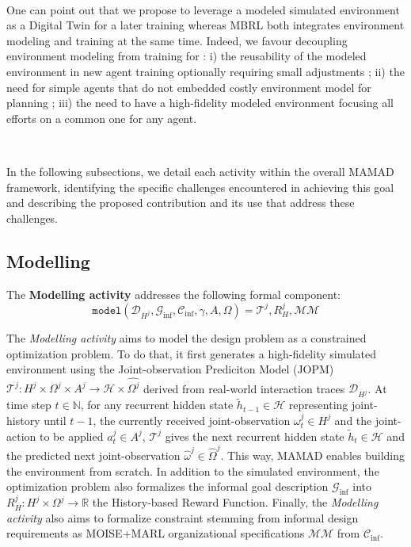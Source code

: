 \documentclass[pdflatex,sn-mathphys-num]{sn-jnl}%
\theoremstyle{thmstyleone}%
\theoremstyle{thmstyletwo}%
\theoremstyle{thmstylethree}%
\begin{document}
\

\noindent One can point out that we propose to leverage a modeled simulated environment as a Digital Twin for a later training whereas MBRL both integrates environment modeling and training at the same time. Indeed, we favour decoupling environment modeling from training for : i) the reusability of the modeled environment in new agent training optionally requiring small adjustments ; \quad ii) the need for simple agents that do not embedded costly environment model for planning ; \quad iii) the need to have a high-fidelity modeled environment focusing all efforts on a common one for any agent.

\

\noindent In the following subsections, we detail each activity within the overall MAMAD framework, identifying the specific challenges encountered in achieving this goal and describing the proposed contribution and its use that address these challenges.

\subsection{Modelling}\label{sec:modelling}

The \textbf{Modelling activity} addresses the following formal component:
\begin{displaymath}
    \texttt{model}(\mathcal{D}_{H^j}, \mathcal{G}_{\text{inf}}, \mathcal{C}_{\text{inf}}, \gamma, A, \Omega) = \mathcal{T}^j, R^j_H, \mathcal{MM}
\end{displaymath}

\noindent The \textit{Modelling activity} aims to model the design problem as a constrained optimization problem. To do that, it first generates a high-fidelity simulated environment using the Joint-observation Prediciton Model (JOPM) $\mathcal{T}^j: H^j \times \Omega^j \times A^j \rightarrow \mathcal{H} \times \hat{\Omega^j}$ derived from real-world interaction traces $\mathcal{D}_{H^j}$. At time step $t \in \mathbb{N}$, for any recurrent hidden state $\tilde{h}_{t-1} \in \mathcal{H}$ representing joint-history until $t-1$, the currently received joint-observation $\omega_t^j \in H^j$ and the joint-action to be applied $a_t^j \in A^j$, $\mathcal{T}^j$ gives the next recurrent hidden state $\tilde{h}_t \in \mathcal{H}$ and the predicted next joint-observation $\hat{\omega}^j \in \hat{\Omega}^j$. This way, MAMAD enables building the environment from scratch. In addition to the simulated environment, the optimization problem also formalizes the informal goal description $\mathcal{G}_{\text{inf}}$ into $R^j_H: H^j \times \Omega^j \rightarrow \mathbb{R}$ the History-based Reward Function. Finally, the \textit{Modelling activity} also aims to formalize constraint stemming from informal design requirements as MOISE+MARL organizational specifications $\mathcal{MM}$ from $\mathcal{C}_{\text{inf}}$.
\end{document}
